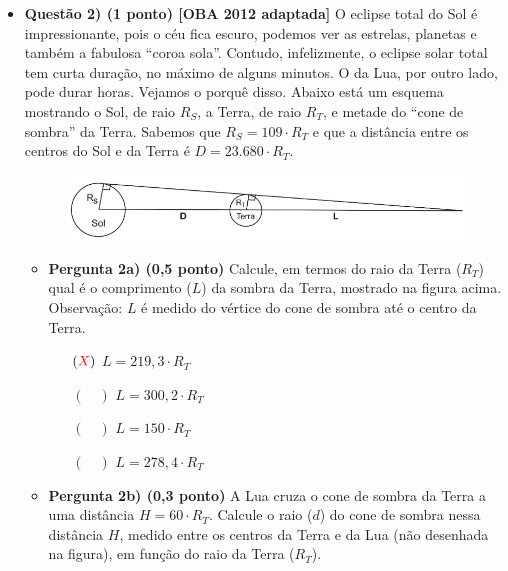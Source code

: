 \documentclass[a4paper, 12pt]{article}
\newcommand{\red}[1]{\textcolor{red}{#1}}
\begin{document}
\begin{flushleft}
\begin{itemize}
            \item \textbf{Questão 2) (1 ponto) [OBA 2012 adaptada]} O eclipse total do Sol é impressionante, pois o céu fica escuro, podemos ver as estrelas, planetas e também a fabulosa ``coroa sola''. Contudo, infelizmente, o eclipse solar total tem curta duração, no máximo de alguns minutos. O da Lua, por outro lado, pode durar horas. Vejamos o porquê disso. \linebreak \linebreak Abaixo está um esquema mostrando o Sol, de raio $R_S$, a Terra, de raio $R_T$, e metade do ``cone de sombra'' da Terra. Sabemos que $R_S = 109 \cdot R_T$ e que a distância entre os centros do Sol e da Terra é $D = 23.680 \cdot R_T$.
                \begin{figure}[H]
                    \centering
                    \includegraphics[scale=0.5]{img/2a.png}
                \end{figure}
                \begin{itemize}
                    \item \textbf{Pergunta 2a) (0,5 ponto)} Calcule, em termos do raio da Terra ($R_T$) qual é o comprimento ($L$) da sombra  da  Terra,  mostrado  na  figura acima. Observação: $L$  é  medido  do  vértice  do  cone  de sombra até o centro da Terra.
                        \begin{itemize}
                            \item[$(\red{X})$] $L = 219,3 \cdot R_T$
                            \item[$(\quad)$] $L = 300,2 \cdot R_T$
                            \item[$(\quad)$] $L = 150 \cdot R_T$
                            \item[$(\quad)$] $L = 278,4 \cdot R_T$
                        \end{itemize}
                    \item \textbf{Pergunta 2b) (0,3 ponto)} A  Lua cruza  o  cone  de  sombra  da  Terra  a uma distância $H = 60 \cdot R_T$. Calcule o raio ($d$) do cone de sombra nessa distância $H$, medido entre os centros da Terra e da Lua (não desenhada na figura), em função do raio da Terra ($R_T$).
                        \begin{figure}[H]

\end{figure}
\end{itemize}
\end{itemize}
\end{flushleft}
\end{document}
